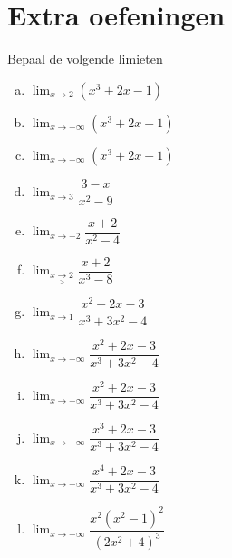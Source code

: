 \documentclass[12pt]{article}
\begin{document}
\pagebreak
\section{Extra oefeningen}

\begin{oefening}
  Bepaal de volgende limieten
  \begin{enumerate}[(a)]
    \itemsep1em
  \item $\displaystyle\lim_{x\to 2}\left(x^3+2x-1\right)$
  \item $\displaystyle\lim_{x\to +\infty}\left(x^3+2x-1\right)$
  \item $\displaystyle\lim_{x\to -\infty}\left(x^3+2x-1\right)$
  \item $\displaystyle\lim_{x\to 3}\dfrac{3-x}{x^2-9}$
  \item $\displaystyle\lim_{x\to -2}\dfrac{x+2}{x^2-4}$
  \item $\displaystyle\lim_{x\underset{>}{\to} 2}\dfrac{x+2}{x^3-8}$
  \item $\displaystyle\lim_{x\to 1}\dfrac{x^2+2x-3}{x^3+3x^2-4}$
  \item $\displaystyle\lim_{x\to +\infty}\dfrac{x^2+2x-3}{x^3+3x^2-4}$
  \item $\displaystyle\lim_{x\to -\infty}\dfrac{x^2+2x-3}{x^3+3x^2-4}$
  \item $\displaystyle\lim_{x\to +\infty}\dfrac{x^3+2x-3}{x^3+3x^2-4}$
  \item $\displaystyle\lim_{x\to +\infty}\dfrac{x^4+2x-3}{x^3+3x^2-4}$
  \item $\displaystyle\lim_{x\to -\infty}\dfrac{x^2(x^2-1)^2}{(2x^2+4)^3}$
  \end{enumerate}
\end{oefening}

\end{document}
